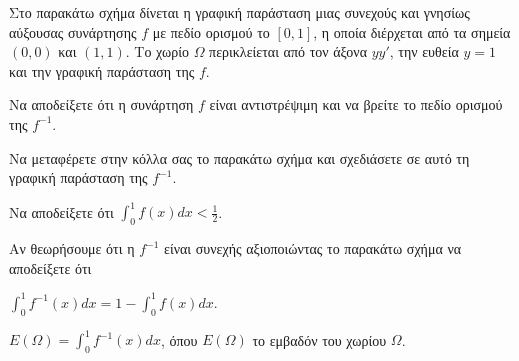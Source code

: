 Στο παρακάτω σχήμα δίνεται η γραφική παράσταση μιας συνεχούς και γνησίως αύξουσας συνάρτησης $f$ με πεδίο ορισμού το $[0,1]$, η οποία διέρχεται από τα σημεία $(0,0)$ και $(1,1)$. Το χωρίο $\Omega$ περικλείεται από τον άξονα $yy'$, την ευθεία $y=1$ και την γραφική παράσταση της $f$.
\begin{alist}
\item Να αποδείξετε ότι η συνάρτηση $f$ είναι αντιστρέψιμη και να βρείτε το πεδίο ορισμού της $f^{-1}$. 
\item Να μεταφέρετε στην κόλλα σας το παρακάτω σχήμα και σχεδιάσετε σε αυτό τη γραφική παράσταση της $f^{-1}$. 
\item Να αποδείξετε ότι $\int_0^1 f(x)dx < \frac{1}{2}$. 
\item Αν θεωρήσουμε ότι η $f^{-1}$ είναι συνεχής αξιοποιώντας το παρακάτω σχήμα να αποδείξετε ότι
    \begin{rlist}
    \item $\int_0^1 f^{-1}(x)dx = 1-\int_0^1 f(x)dx$. 
    \item $E(\Omega) = \int_0^1 f^{-1}(x)dx$, όπου $E(\Omega)$ το εμβαδόν του χωρίου $\Omega$. 
    \end{rlist}
\end{alist}